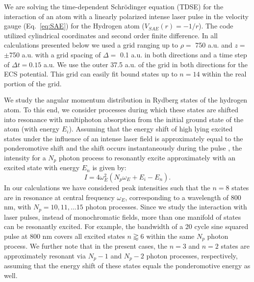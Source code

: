 
We are solving the time-dependent Schr\"{o}dinger equation (TDSE) for the interaction of an atom with a linearly polarized intense laser pulse in the velocity gauge (Eq.~\ref{eq:SAE}) for the Hydrogen atom ($V_{SAE}(r)=-1/r$). The code utilized cylindrical coordinates and second order finite difference. In all calculations presented below we used a grid ranging up to $\rho=$ 750 a.u. and $z=$ $\pm$750 a.u. with a grid spacing of $\Delta =$ 0.1 a.u. in both directions and a time step of $\Delta t = 0.15$ a.u. We use the outer 37.5 a.u. of the grid in both directions for the ECS potential. This grid can easily fit bound states up to $n = 14$ within the real portion of the grid. 

We study the angular momentum distribution in Rydberg states of the hydrogen atom. To this end, we consider processes during which these states are shifted into resonance with multiphoton absorption from the initial ground state of the atom (with energy $E_i$). Assuming that the energy shift of high lying excited states under the influence of an intense laser field is approximately equal to the ponderomotive shift \cite{agostini89} and the shift occurs instantaneously during the pulse \cite{he11}, the intensity for a $N_p$ photon process to resonantly excite  approximately with an excited state with energy $E_n$ is given by:
%
\begin{equation}
I = 4\omega_E^2(N_p\omega_E + E_i - E_n).
\end{equation}
%
In our calculations we have considered peak intensities such that the $n=8$ states are in resonance at central frequency $\omega_E$, corresponding to a wavelength of 800 nm, with $N_p = 10, 11, \ldots 15$ photon processes. Since we study the interaction with laser pulses, instead of monochromatic fields, more than one manifold of states can be resonantly excited. For example, the bandwidth of a 20 cycle sine squared pulse at 800 nm covers all excited states $n \gtrapprox 6$ within the same $N_p$ photon process. We further note that in the present cases, the $n=3$ and $n=2$ states are approximately resonant via $N_p-1$ and $N_p-2$ photon processes, respectively, assuming that the energy shift of these states equals the ponderomotive energy as well.

